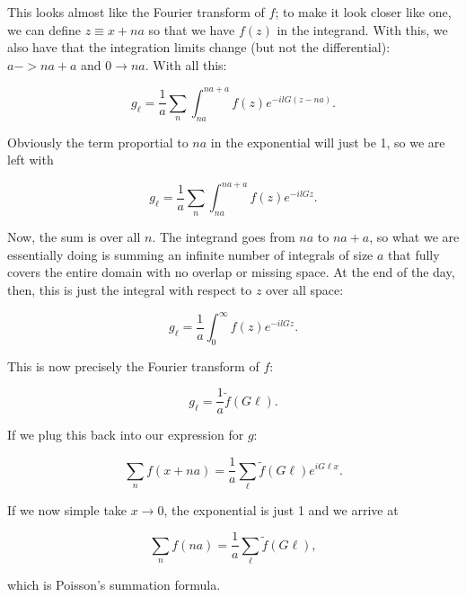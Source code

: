 \begin{parts}
  This looks almost like the Fourier transform of $f$; to make it look closer like one, we can define $z \equiv x+na$ so that we have $f(z)$ in the integrand. With this, we also have that the integration limits change (but not the differential): $a -> na+a$ and $0 \rightarrow na$. With all this:

  \begin{equation}
    g_\ell = \frac{1}{a}\sum_n \int_{na}^{na+a} f(z) e^{-ilG(z-na)}.
  \end{equation}

  Obviously the term proportial to $na$ in the exponential will just be 1, so we are left with

  \begin{equation}
    g_\ell = \frac{1}{a}\sum_n \int_{na}^{na+a} f(z) e^{-ilGz}.
  \end{equation}

  Now, the sum is over all $n$. The integrand goes from $na$ to $na+a$, so what we are essentially doing is summing an infinite number of integrals of size $a$ that fully covers the entire domain with no overlap or missing space. At the end of the day, then, this is just the integral with respect to $z$ over all space:

  \begin{equation}
    g_\ell = \frac{1}{a} \int_0^{\infty} f(z) e^{-ilGz}.
  \end{equation}

  This is now precisely the Fourier transform of $f$:

  \begin{equation}
    g_\ell = \frac{1}{a} \tilde{f}(G\ell).
  \end{equation}

  If we plug this back into our expression for $g$:

  \begin{equation}
    \sum_n f(x+na) = \frac{1}{a}\sum_\ell \tilde{f}(G\ell) e^{iG\ell x}.
  \end{equation}

  If we now simple take $x \rightarrow 0$, the exponential is just 1 and we arrive at

  \begin{equation}
    \boxed{\sum_n f(na) = \frac{1}{a}\sum_\ell \tilde{f}(G\ell),}
  \end{equation}

  which is Poisson's summation formula.

\end{parts}



